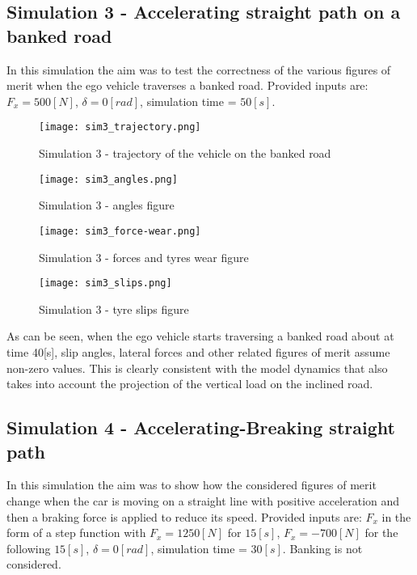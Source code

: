 \documentclass{report}
\let\Oldsubsection\subsection
\renewcommand{\subsection}{\FloatBarrier\Oldsubsection}
\begin{document}
\subsection{Simulation 3 - Accelerating straight path on a banked road}
In this simulation the aim was to test the correctness of the various figures of merit when the ego vehicle traverses a banked road. Provided inputs are: $F_x = 500 [N]$, $\delta = 0 [rad]$, simulation time = $50 [s]$. 

\begin{figure}[h!]
    \centering
    \texttt{[image: sim3\_trajectory.png]}
    \caption{Simulation 3 - trajectory of the vehicle on the banked road}
    \label{fig:sim3_1}
\end{figure}

\begin{figure}[h!]
    \centering
    \texttt{[image: sim3\_angles.png]}
    \caption{Simulation 3 - angles figure}
    \label{fig:sim3_2}
\end{figure}

\begin{figure}[h!]
    \centering
    \texttt{[image: sim3\_force-wear.png]}
    \caption{Simulation 3 - forces and tyres wear figure}
    \label{fig:sim3_3}
\end{figure}

\begin{figure}[h!]
    \centering
    \texttt{[image: sim3\_slips.png]}
    \caption{Simulation 3 - tyre slips figure}
    \label{fig:sim3_4}
\end{figure}

As can be seen, when the ego vehicle starts traversing a banked road about at time 40[s], slip angles, lateral forces and other related figures of merit assume non-zero values. This is clearly consistent with the model dynamics that also takes into account the projection of the vertical load on the inclined road.\\


\subsection{Simulation 4 - Accelerating-Breaking straight path}
In this simulation the aim was to show how the considered figures of merit change when the car is moving on a straight line with positive acceleration and then a braking force is applied to reduce its speed. Provided inputs are: $F_x$ in the form of a step function with $F_x = 1250 [N]$ for $15[s]$, $F_x = -700 [N]$ for the following $15[s]$, $\delta = 0 [rad]$, simulation time = $30 [s]$. Banking is not considered.
\end{document}
